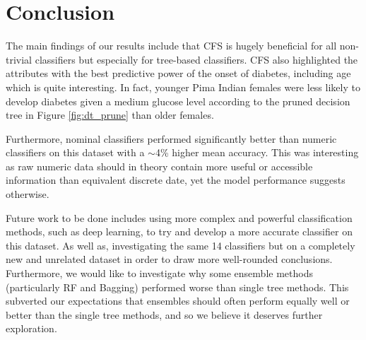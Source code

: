 \section{Conclusion}


The main findings of our results include that CFS is hugely beneficial for all non-trivial classifiers but especially for tree-based classifiers. CFS also highlighted the attributes with the best predictive power of the onset of diabetes, including age which is quite interesting. In fact, younger Pima Indian females were less likely to develop diabetes given a medium glucose level according to the pruned decision tree in Figure \ref{fig:dt_prune} than older females.

Furthermore, nominal classifiers performed significantly better than numeric classifiers on this dataset with a $\sim$4\% higher mean accuracy. This was interesting as raw numeric data should in theory contain more useful or accessible information than equivalent discrete date, yet the model performance suggests otherwise.

Future work to be done includes using more complex and powerful classification methods, such as deep learning, to try and develop a more accurate classifier on this dataset. As well as, investigating the same 14 classifiers but on a completely new and unrelated dataset in order to draw more well-rounded conclusions. Furthermore, we would like to investigate why some ensemble methods (particularly RF and Bagging) performed worse than single tree methods. This subverted our expectations that ensembles should often perform equally well or better than the single tree methods, and so we believe it deserves further exploration.

